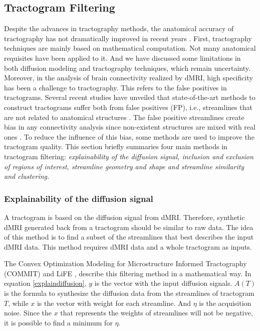 \subsection{Tractogram Filtering}

Despite the advances in tractography methods, the anatomical accuracy of tractography has not dramatically improved in recent years \cite*[]{schillingLimitsAnatomicalAccuracy2019}.
First, tractography techniques are mainly based on mathematical computation. Not many anatomical requisites have been applied
to it. And we have discussed some limitations in both diffusion modeling and tractography techniques, which remain uncertainty.
Moreover, in the analysis of brain connectivity realized by dMRI, high specificity has been a challenge to tractography.
This refers to the false positives in tractograms.
Several recent studies have unveiled that state-of-the-art methods to construct tractograms suffer both from false positives (FP), 
i.e., streamlines that are not related to anatomical structures \cite*[]{maier-heinChallengeMappingHuman2017}.
The false positive streamlines create bias in any connectivity analysis since non-existent structures are mixed with real ones \cite*[]{gleichgerrchtDeepLearningApplied2018}. 
To reduce the influence of this bias, some methods are used to improve the tractogram quality. 
This section briefly summaries four main methods in tractogram filtering:
\textit{explainability of the diffusion signal, inclusion and exclusion of regions of interest, streamline geometry and shape and streamline similarity and clustering.} 


\subsubsection{Explainability of the diffusion signal}

A tractogram is based on the diffusion signal from dMRI. 
Therefore, synthetic dMRI generated back from a tractogram should be similar to raw data.
The idea of this method is to find a subset of the streamlines that best describes the input dMRI data. 
This method requires dMRI data and a whole tractogram as inputs.

The Convex Optimization Modeling for Microstructure Informed Tractography (COMMIT) \cite*[]{daducciCOMMITConvexOptimization2015} and LiFE \cite*[]{pestilliEvaluationStatisticalInference2014}, 
describe this filtering method in a mathematical way. 
In equation \ref*{explaindiffusion}, $y$ is the vector with the input diffusion signals. 
$A(T)$ is the formula to synthesize the diffusion data from the streamlines of tractogram $T$, 
while $x$ is the vector with weight for each streamline. And $\eta$ is the acquisition noise. 
Since the $x$ that represents the weights of streamlines will not be negative, 
it is possible to find a minimum for $\eta$. 

